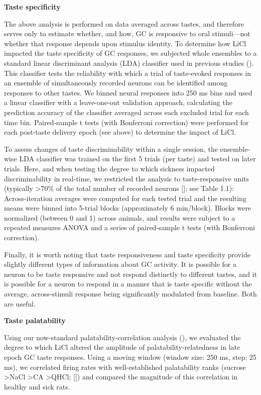 \begin{refsection}
\smallskip
\noindent\textbf{Taste specificity}\par
\noindent 
The above analysis is performed on data averaged across tastes, and therefore serves only to estimate whether, and how, GC is responsive to oral stimuli—not whether that response depends upon stimulus identity. To determine how LiCl impacted the taste specificity of GC responses, we subjected whole ensembles to a standard linear discriminant analysis (LDA) classifier used in previous studies (\cite{katz2001a,sadacca2016a,nicolelis1997a}). This classifier tests the reliability with which a trial of taste-evoked responses in an ensemble of simultaneously recorded neurons can be identified among responses to other tastes. We binned neural responses into 250 ms bins and used a linear classifier with a leave-one-out validation approach, calculating the prediction accuracy of the classifier averaged across each excluded trial for each time bin. Paired-sample t tests (with Bonferroni correction) were performed for each post-taste delivery epoch (see above) to determine the impact of LiCl.

To assess changes of taste discriminability within a single session, the ensemble-wise LDA classifier was trained on the first 5 trials (per taste) and tested on later trials. Here, and when testing the degree to which sickness impacted discriminability in real-time, we restricted the analysis to taste-responsive units (typically \textgreater70\% of the total number of recorded neurons [\cite{katz-a,katz2001a,jones2007a}]; see Table 1.1): Across-iteration averages were computed for each tested trial and the resulting means were binned into 5-trial blocks (approximately 6 min/block). Blocks were normalized (between 0 and 1) across animals, and results were subject to a repeated measures ANOVA and a series of paired-sample t tests (with Bonferroni correction).

Finally, it is worth noting that taste responsiveness and taste specificity provide slightly different types of information about GC activity. It is possible for a neuron to be taste responsive and not respond distinctly to different tastes, and it is possible for a neuron to respond in a manner that is taste specific without the average, across-stimuli response being significantly modulated from baseline. Both are useful.

\smallskip
\noindent\textbf{Taste palatability}\par
\noindent 
Using our now-standard palatability-correlation analysis (\cite{sadacca2016a,moran2014a,li2016a,piette2012a}), we evaluated the degree to which LiCl altered the amplitude of palatability-relatedness in late epoch GC taste responses. Using a moving window (window size: 250 ms, step: 25 ms), we correlated firing rates with well-established palatability ranks (sucrose \textgreater NaCl \textgreater CA \textgreater QHCl; [\cite{sadacca2016a,li2013a}]) and compared the magnitude of this correlation in healthy and sick rats.


\end{refsection}
